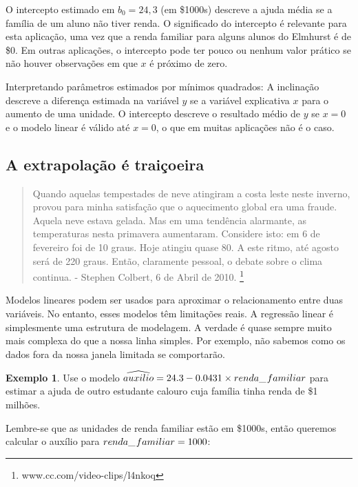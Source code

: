 \documentclass[
]{book}
\theoremstyle{definition}
\theoremstyle{definition}
\newtheorem{example}{Exemplo}[chapter]
\theoremstyle{definition}
\theoremstyle{definition}
\theoremstyle{remark}
\begin{document}
O intercepto estimado em \(b_0=24,3\) (em \$1000s) descreve a ajuda média se a família de um aluno não tiver renda. O significado do intercepto é relevante para esta aplicação, uma vez que a renda familiar para alguns alunos do Elmhurst é de \$0. Em outras aplicações, o intercepto pode ter pouco ou nenhum valor prático se não houver observações em que \(x\) é próximo de zero.

Interpretando parâmetros estimados por mínimos quadrados: A inclinação descreve a diferença estimada na variável \(y\) se a variável explicativa \(x\) para o aumento de uma unidade. O intercepto descreve o resultado médio de \(y\) se \(x=0\) e o modelo linear é válido até \(x = 0\), o que em muitas aplicações não é o caso.

\hypertarget{extrapolationTricky}{%
\subsection{A extrapolação é traiçoeira}\label{extrapolationTricky}}

\begin{quote}
Quando aquelas tempestades de neve atingiram a costa leste neste inverno, provou para minha satisfação que o aquecimento global era uma fraude. Aquela neve estava gelada. Mas em uma tendência alarmante, as temperaturas nesta primavera aumentaram. Considere isto: em 6 de fevereiro foi de 10 graus. Hoje atingiu quase 80. A este ritmo, até agosto será de 220 graus. Então, claramente pessoal, o debate sobre o clima continua. - Stephen Colbert, 6 de Abril de 2010. \footnote{www.cc.com/video-clips/l4nkoq}
\end{quote}

Modelos lineares podem ser usados para aproximar o relacionamento entre duas variáveis. No entanto, esses modelos têm limitações reais. A regressão linear é simplesmente uma estrutura de modelagem. A verdade é quase sempre muito mais complexa do que a nossa linha simples. Por exemplo, não sabemos como os dados fora da nossa janela limitada se comportarão.

\begin{example}
\protect\hypertarget{exm:unnamed-chunk-278}{}{\label{exm:unnamed-chunk-278} }Use o modelo \(\widehat{auxilio} = 24.3 - 0.0431\times renda\_\hspace{0.3mm}familiar\) para estimar a ajuda de outro estudante calouro cuja família tinha renda de \$1 milhões.
\end{example}

Lembre-se que as unidades de renda familiar estão em \$1000s, então queremos calcular o auxílio para \(renda\_\hspace{0.3mm}familiar = 1000\):
\end{document}

